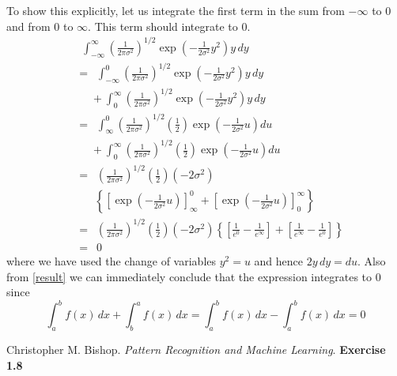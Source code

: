 \documentclass[14pt]{extarticle}
\begin{document}
\begin{flushleft}
To show this explicitly, let us integrate the first term in the sum from $-\infty$ to 0 and from 0 to $\infty$. This term should integrate to 0. 
\begin{align*}
& \,\,\,\int_{-\infty}^{\infty} \left(\frac{1}{2\pi\sigma^2}\right)^{1/2}\exp\left(-\frac{1}{2\sigma^2}y^2\right)y\,dy\\
&=\,\,\,\int_{-\infty}^{0} \left(\frac{1}{2\pi\sigma^2}\right)^{1/2}\exp\left(-\frac{1}{2\sigma^2}y^2\right)y\,dy\\ &\,\,\,\,\,\,\,\,+ \int_{0}^{\infty} \left(\frac{1}{2\pi\sigma^2}\right)^{1/2}\exp\left(-\frac{1}{2\sigma^2}y^2\right)y\,dy\\
&=\,\,\,\int_{\infty}^{0} \left(\frac{1}{2\pi\sigma^2}\right)^{1/2}\left(\frac{1}{2}\right)\exp\left(-\frac{1}{2\sigma^2}u\right)du\\ &\,\,\,\,\,\,\,\,+ \int_{0}^{\infty} \left(\frac{1}{2\pi\sigma^2}\right)^{1/2}\left(\frac{1}{2}\right)\exp\left(-\frac{1}{2\sigma^2}u\right)du \tag{i}\label{result}\\
&=\,\,\,\left(\frac{1}{2\pi\sigma^2}\right)^{1/2}\left(\frac{1}{2}\right)\left(-{2\sigma^2}\right)\\ &\,\,\,\,\,\,\,\,\,\,\left\lbrace\left[\exp\left(-\frac{1}{2\sigma^2}u\right)\right]_{\infty}^{0} + \left[\exp\left(-\frac{1}{2\sigma^2}u\right)\right]_{0}^{\infty}\right\rbrace\\
&=\,\,\,\left(\frac{1}{2\pi\sigma^2}\right)^{1/2}\left(\frac{1}{2}\right)\left(-{2\sigma^2}\right)\left\lbrace\left[\frac{1}{e^0}-\frac{1}{e^\infty}\right] + \left[\frac{1}{e^\infty}-\frac{1}{e^0}\right]\right\rbrace\\
&=\,\,\,0
\end{align*}
where we have used the change of variables $y^2=u$ and hence $2y\,dy=du$. Also from \eqref{result} we can immediately conclude that the expression integrates to 0 since $$\int_{a}^{b} f(x)\, dx + \int_{b}^{a} f(x)\, dx = \int_{a}^{b} f(x)\, dx - \int_{a}^{b} f(x)\, dx = 0$$
\end{flushleft}
\begin{thebibliography}{9}
Christopher M. Bishop. 
\textit{ Pattern Recognition and Machine Learning}.  
\textbf{Exercise 1.8}
\end{thebibliography}
\end{document}
